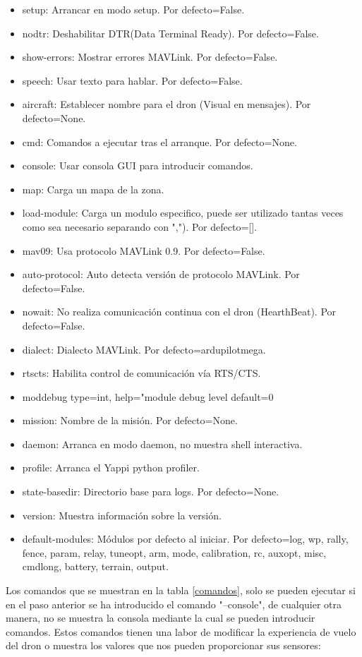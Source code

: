\begin{multicols}{2}
\begin{itemize}
\item setup: Arrancar en modo setup. Por defecto=False.
\item nodtr: Deshabilitar DTR(Data Terminal Ready). Por defecto=False.
\item show-errors: Mostrar errores MAVLink. Por defecto=False.
\item speech: Usar texto para hablar. Por defecto=False.
\item aircraft: Establecer nombre para el dron (Visual en mensajes). Por defecto=None.
\item cmd: Comandos a ejecutar tras el arranque. Por defecto=None.
\item console: Usar consola GUI para introducir comandos. 
\item map: Carga un mapa de la zona.
\item load-module: Carga un modulo especifico, puede ser utilizado tantas veces como sea necesario separando con ","). Por defecto=[].
\item mav09: Usa protocolo MAVLink 0.9. Por defecto=False.
\item auto-protocol: Auto detecta versión de protocolo MAVLink. Por defecto=False.
\item nowait: No realiza comunicación continua con el dron (HearthBeat). Por defecto=False.
\item dialect: Dialecto MAVLink. Por defecto=ardupilotmega.
\item rtscts: Habilita control de comunicación vía RTS/CTS.
\item moddebug  type=int, help="module debug level default=0
\item mission: Nombre de la misión. Por defecto=None.
\item daemon: Arranca en modo daemon, no muestra shell interactiva.
\item profile: Arranca el Yappi python profiler.
\item state-basedir: Directorio base para logs. Por defecto=None.
\item version: Muestra información sobre la versión.
\item default-modules: Módulos por defecto al iniciar. Por defecto=log, wp, rally, fence, param, relay, tuneopt, arm, mode, calibration, rc, auxopt, misc, cmdlong, battery, terrain, output.
\end{itemize}
\end{multicols}

Los comandos que se muestran en la tabla \ref{comandos}, solo se pueden ejecutar si en el paso anterior se ha introducido el comando "--console", de cualquier otra manera, no se muestra la consola mediante la cual se pueden introducir comandos. Estos comandos tienen una labor de modificar la experiencia de vuelo del dron o muestra los valores que nos pueden proporcionar sus sensores:

